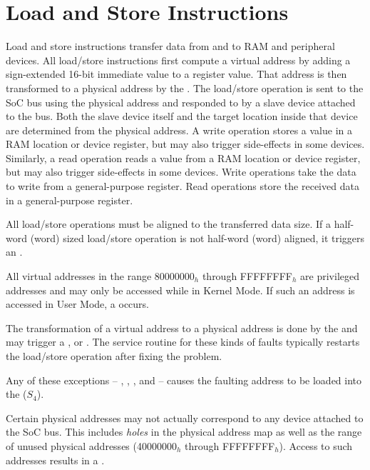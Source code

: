 \section{Load and Store Instructions}

Load and store instructions transfer data from and to RAM and peripheral devices. All load/store instructions first compute a virtual address by adding a sign-extended 16-bit immediate value to a register value. That address is then transformed to a physical address by the \mmux. The load/store operation is sent to the SoC bus using the physical address and responded to by a slave device attached to the bus. Both the slave device itself and the target location inside that device are determined from the physical address. A write operation stores a value in a RAM location or device register, but may also trigger side-effects in some devices. Similarly, a read operation reads a value from a RAM location or device register, but may also trigger side-effects in some devices. Write operations take the data to write from a general-purpose register. Read operations store the received data in a general-purpose register.

All load/store operations must be aligned to the transferred data size. If a half-word (word) sized load/store operation is not half-word (word) aligned, it triggers an .

All virtual addresses in the range 80000000$_h$ through FFFFFFFF$_h$ are privileged addresses and may only be accessed while in Kernel Mode. If such an address is accessed in User Mode, a  occurs.

The transformation of a virtual address to a physical address is done by the \mmu and may trigger a ,  or . The service routine for these kinds of faults typically restarts the load/store operation after fixing the problem.

Any of these exceptions -- , , ,  and  -- causes the faulting address to be loaded into the  ($S_4$).

Certain physical addresses may not actually correspond to any device attached to the SoC bus. This includes {\it holes} in the physical address map as well as the range of unused physical addresses (40000000$_h$ through FFFFFFFF$_h$). Access to such addresses results in a .

